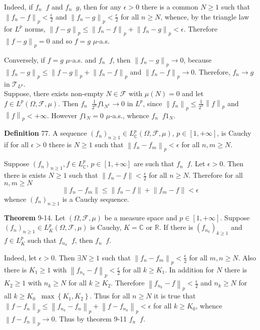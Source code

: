 \documentclass[a4paper]{article}
\newcommand{\obj}[1]{\left\{ #1 \right \}}
\newcommand{\clo}[1]{\left [ #1 \right ]}
\newcommand{\brac}[1]{\left ( #1 \right )}
\newcommand{\nrm}[1]{\left\| #1 \right \|}
\newcommand{\Real}{\mathbb{R}}
\newcommand{\Cplx}{\mathbb{C}}
\newcommand{\Tcal}{\mathcal{T}}
\newcommand{\Fcal}{\mathcal{F}}
\newcommand{\defn}{\mathop{\overset{\Delta}{=}}\nolimits}
\newcommand{\lpto}{\mathop{\overset{L^p}{\to}}\nolimits}
\begin{document}
Indeed, if $f_n\lpto f$ and $f_n\lpto g$, then for any $\epsilon>0$ there is a common $N\geq 1$ such that $\nrm{f_n-f}_p<\frac{\epsilon}{2}$ and $\nrm{f_n-g}_p<\frac{\epsilon}{2}$ for all $n\geq N$, whence, by the triangle law for $L^p$ norms, $\nrm{f-g}_p\leq \nrm{f_n-f}_p+\nrm{f_n-g}_p<\epsilon$. Therefore $\nrm{f-g}_p=0$ and so $f=g$ $\mu$-a.s.

Conversely, if $f=g$ $\mu$-a.s. and $f_n\lpto f$, then $\nrm{f_n-g}_p \to 0$, because $\nrm{f_n-g}_p\leq \nrm{f-g}_p + \nrm{f_n-f}_p$ and $\nrm{f_n-f}_p \to 0$. Therefore, $f_n\to g$ in $\Tcal_{L^p}$.\\

Suppose, there exists non-empty $N\in\Fcal$ with $\mu\brac{N}=0$ and let $f\in L^p\brac{\Omega, \Fcal, \mu}$. Then $f_n\defn \frac{1}{2^n} f 1_{N^c} \to 0$ in $L^p$, since $\nrm{f_n}_p \leq \frac{1}{2^n} \nrm{f}_p$ and $\nrm{f}_p<+\infty$. However $f 1_N = 0$ $\mu$-a.s., whence $f_n\lpto f 1_N$.

\noindent \textbf{Definition} 77.
A sequence $\brac{f_n}_{n\geq 1}\in L^p_\Cplx\brac{\Omega, \Fcal, \mu}$, $p\in \clo{1, +\infty}$, is Cauchy if for all $\epsilon>0$ there is $N\geq 1$ such that $\nrm{f_n-f_m}_p<\epsilon$ for all $n,m\geq N$.

Suppose $\brac{f_n}_{n\geq 1}, f\in L^p_\Cplx$, $p\in \clo{1,+\infty}$ are such that $f_n\lpto f$. Let $\epsilon>0$. Then there is exists $N\geq 1$ such that $\nrm{f_n-f}<\frac{\epsilon}{2}$ for all $n\geq N$. Therefore for all $n,m \geq N$ \[\nrm{f_n-f_m}\leq \nrm{f_n-f}+\nrm{f_m-f}<\epsilon\] whence $\brac{f_n}_{n\geq 1}$ is a Cauchy sequence.

\label{thm:cauchy_subseq_conv} \noindent \textbf{Theorem} 9-14.
Let $\brac{\Omega, \Fcal, \mu}$ be a measure space and $p\in \clo{1,+\infty}$. Suppose $\brac{f_n}_{n\geq 1}\in L^p_K\brac{\Omega, \Fcal, \mu}$ is Cauchy, $K=\Cplx$ or $\Real$. If there is $\brac{f_{n_k}}_{k\geq 1}$ and $f\in L^p_K$ such that $f_{n_k}\lpto f$, then $f_n\lpto f$.

Indeed, let $\epsilon>0$. Then $\exists N\geq 1$ such that $\nrm{f_n-f_m}_p<\frac{\epsilon}{2}$ for all $m, n\geq N$. Also there is $K_1\geq 1$ with $\nrm{f_{n_k}-f}_p<\frac{\epsilon}{2}$ for all $k\geq K_1$. In addition for $N$ there is $K_2\geq 1$ with $n_k\geq N$ for all $k\geq K_2$. Therefore $\nrm{f_{n_k}-f}_p<\frac{\epsilon}{2}$ and $n_k\geq N$ for all $k\geq K_0\defn \max\obj{K_1, K_2}$. Thus for all $n\geq N$ it is true that $\nrm{f-f_n}_p \leq \nrm{f_{n_k}-f_n}_p + \nrm{f-f_{n_k}}_p < \epsilon$ for all $k\geq K_0$, whence $\nrm{f-f_n}_p \to 0$. Thus by theorem 9-11 $f_n\lpto f$.\\
\end{document}
